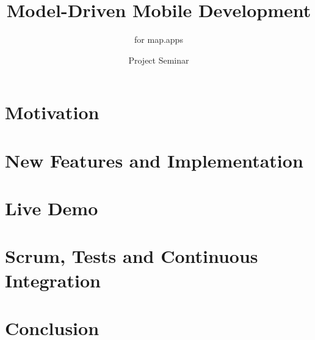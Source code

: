 \documentclass{beamer}
\author{Project Seminar \MD}
\title{Model-Driven Mobile Development}
\subtitle{\MD for map.apps}
\begin{document}
	\begin{frame}[plain]
	  \maketitle
	\end{frame}
    
    \section{Motivation}
    
    
    \section[Features]{New Features and Implementation}
    
    
    \section{Live Demo}
    
    
    \section[Scrum, Tests and CI]{Scrum, Tests and Continuous Integration}
    
    
    \section{Conclusion}
    
\end{document}
